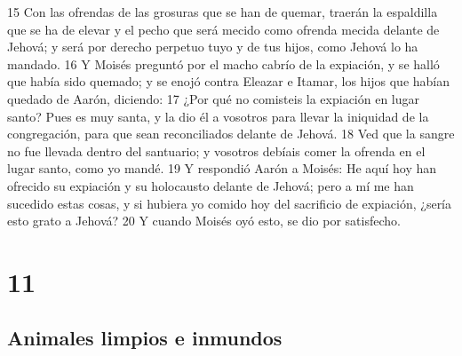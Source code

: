15 Con las ofrendas de las grosuras que se han de quemar, traerán la espaldilla que se ha de elevar y el pecho que será mecido como ofrenda mecida delante de Jehová; y será por derecho perpetuo tuyo y de tus hijos, como Jehová lo ha mandado.
16 Y Moisés preguntó por el macho cabrío de la expiación, y se halló que había sido quemado; y se enojó contra Eleazar e Itamar, los hijos que habían quedado de Aarón, diciendo:
17 ¿Por qué no comisteis la expiación en lugar santo? Pues es muy santa, y la dio él a vosotros para llevar la iniquidad de la congregación, para que sean reconciliados delante de Jehová.
18 Ved que la sangre no fue llevada dentro del santuario; y vosotros debíais comer la ofrenda en el lugar santo, como yo mandé.
19 Y respondió Aarón a Moisés: He aquí hoy han ofrecido su expiación y su holocausto delante de Jehová; pero a mí me han sucedido estas cosas, y si hubiera yo comido hoy del sacrificio de expiación, ¿sería esto grato a Jehová?
20 Y cuando Moisés oyó esto, se dio por satisfecho.  

\chapter{11}

\section{Animales limpios e inmundos}

